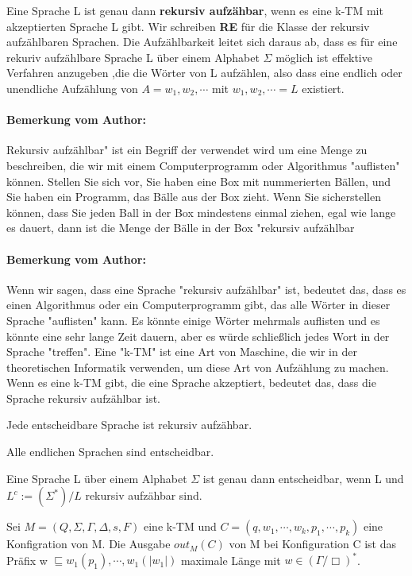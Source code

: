   Eine Sprache L ist genau dann \textbf{rekursiv aufzähbar}, wenn es eine k-TM mit akzeptierten Sprache L gibt. Wir schreiben \textbf{RE} für die Klasse der rekursiv aufzählbaren Sprachen. Die Aufzählbarkeit leitet sich daraus ab, dass es für eine rekuriv aufzählbare Sprache L über einem Alphabet \(\Sigma\) möglich ist effektive Verfahren anzugeben ,die die Wörter von L aufzählen, also dass eine endlich oder unendliche Aufzählung von \(A = w_1, w_2, \cdots \) mit \( {w_1, w_2, \cdots} = L\) existiert.

\paragraph*{Bemerkung vom Author: }
  Rekursiv aufzählbar" ist ein Begriff der verwendet wird um eine Menge zu beschreiben, die wir mit einem Computerprogramm oder Algorithmus "auflisten" können. Stellen Sie sich vor, Sie haben eine Box mit nummerierten Bällen, und Sie haben ein Programm, das Bälle aus der Box zieht. Wenn Sie sicherstellen können, dass Sie jeden Ball in der Box mindestens einmal ziehen, egal wie lange es dauert, dann ist die Menge der Bälle in der Box "rekursiv aufzählbar

\paragraph*{Bemerkung vom Author: }
  Wenn wir sagen, dass eine Sprache "rekursiv aufzählbar" ist, bedeutet das, dass es einen Algorithmus oder ein Computerprogramm gibt, das alle Wörter in dieser Sprache "auflisten" kann. Es könnte einige Wörter mehrmals auflisten und es könnte eine sehr lange Zeit dauern, aber es würde schließlich jedes Wort in der Sprache "treffen". Eine "k-TM" ist eine Art von Maschine, die wir in der theoretischen Informatik verwenden, um diese Art von Aufzählung zu machen. Wenn es eine k-TM gibt, die eine Sprache akzeptiert, bedeutet das, dass die Sprache rekursiv aufzählbar ist.

  Jede entscheidbare Sprache ist rekursiv aufzähbar.

  Alle endlichen Sprachen sind entscheidbar.

  Eine Sprache L über einem Alphabet \(\Sigma\) ist genau dann entscheidbar, wenn L und \(L^c :=(\Sigma^*)/L\) rekursiv aufzähbar sind.

  Sei \(M = (Q, \Sigma, \Gamma, \Delta, s, F)\) eine k-TM und \(C = (q, w_1, \cdots, w_k, p_1, \cdots, p_k)\) eine Konfigration von M. Die Ausgabe \(out_M(C)\) von M bei Konfiguration C ist das Präfix w \(\sqsubseteq w_1(p_1), \cdots, w_1(|w_1|)\) maximale Länge mit \(w \in (\Gamma / {\Box})^*\).

